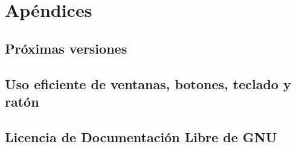 \clearpage\chapter{Apéndices}
\section{Próximas versiones}
\section{Uso eficiente de ventanas, botones, teclado y ratón}
\section{Licencia de Documentación Libre de GNU}

\bigskip


\bigskip
